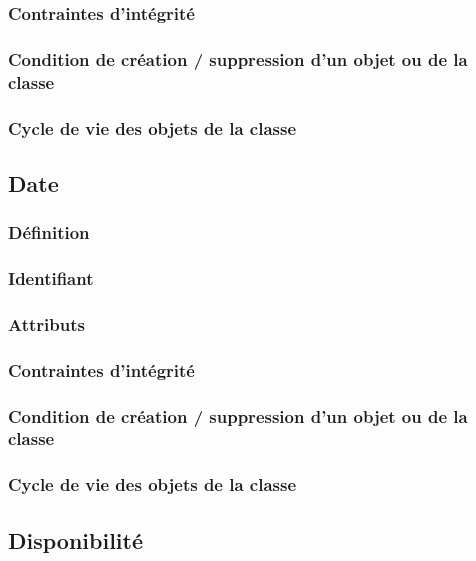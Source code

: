 \documentclass[a4paper, 11pt]{report}
\begin{document}
\subsubsection{Contraintes d'intégrité}

\subsubsection{Condition de création / suppression d'un objet ou de la classe}

\subsubsection{Cycle de vie des objets de la classe}

\subsection{Date}

\subsubsection{Définition}

\subsubsection{Identifiant}

\subsubsection{Attributs}

\subsubsection{Contraintes d'intégrité}

\subsubsection{Condition de création / suppression d'un objet ou de la classe}

\subsubsection{Cycle de vie des objets de la classe}

\subsection{Disponibilité}
\end{document}
